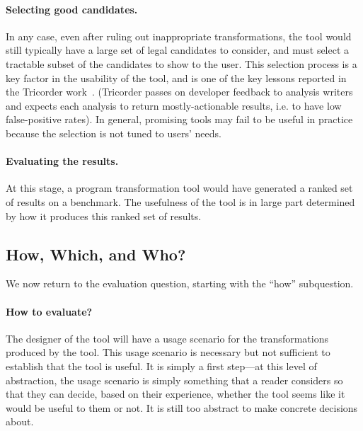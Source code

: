\paragraph{Selecting good candidates.} In any case, even after ruling out 
inappropriate transformations, the tool would still typically have a large
set of legal candidates to consider, and must select a tractable subset of the
candidates to show to the user. This selection process is a key factor
in the usability of the tool, and is one of the key lessons reported
in the Tricorder
work~\cite{sadowski18:_lesson_build_static_analy_tools_googl}.
(Tricorder passes on developer feedback to analysis writers
and expects each analysis to return mostly-actionable results, i.e.
to have low false-positive rates).
In general, promising tools may fail to be useful in practice because the
selection is not tuned to users' needs.

\paragraph{Evaluating the results.} At this stage, a program
transformation tool would have generated a ranked set of results on a
benchmark. The usefulness of the tool is in large part determined
by how it produces this ranked set of results.

\subsection{How, Which, and Who?}
We now return to the evaluation question, starting with the ``how'' subquestion.

\paragraph{How to evaluate?} The designer of the tool will have a usage scenario for the
transformations produced by the tool. This usage scenario is necessary
but not sufficient to establish that the tool is useful. It is simply
a first step---at this level of abstraction, the usage scenario is
simply something that a reader considers so that they can decide,
based on their experience, whether the tool seems like it would be
useful to them or not.  It is still too abstract to make concrete
decisions about.

